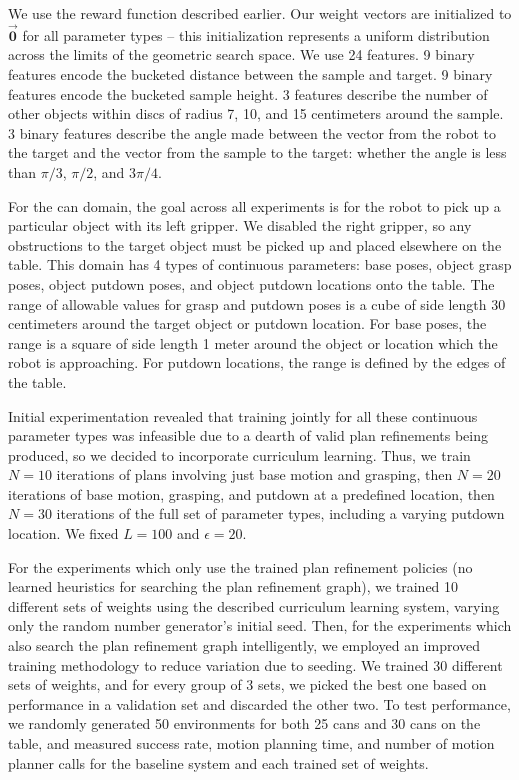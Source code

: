 We use the reward function described earlier. Our weight
vectors are initialized to $\vec{\mathbf{0}}$ for all parameter types -- this
initialization represents a uniform distribution across the limits of the geometric search space.
We use 24 features. 9 binary features encode the bucketed distance between the sample
and target. 9 binary features encode the bucketed sample height. 3 features
describe the number of other objects within discs of radius 7, 10, and 15 centimeters around the
sample. 3 binary features describe the angle made between the vector from the
robot to the target and the vector from the sample to the target: whether the angle is less than
$\pi/3$, $\pi/2$, and $3\pi/4$.

For the can domain, the goal across all experiments is for the robot to pick up a particular object with its
left gripper. We disabled the right gripper, so any obstructions to the target object must be picked up and
placed elsewhere on the table. This domain has 4 types of continuous parameters: base poses, object grasp
poses, object putdown poses, and object putdown locations onto the table. The range of allowable values for
grasp and putdown poses is a cube of side length 30 centimeters around
the target object or putdown location. For base poses, the range is a
square of side length 1 meter around the object or location which the robot is approaching. For putdown locations,
the range is defined by the edges of the table.

Initial experimentation revealed that training jointly for all these continuous
parameter types was infeasible due to a dearth of valid plan refinements being produced, so we decided to
incorporate curriculum learning. Thus, we train $N = 10$ iterations of plans involving just base motion and grasping,
then $N = 20$ iterations of base motion, grasping, and putdown at a predefined location, then $N = 30$ iterations of
the full set of parameter types, including a varying putdown location. We fixed $L = 100$ and $\epsilon = 20$.

For the experiments which only use the trained plan refinement policies (no learned heuristics for searching the plan
refinement graph), we trained 10 different sets of weights using the described curriculum learning system, varying
only the random number generator's initial seed. Then, for the experiments which also search the plan refinement graph
intelligently, we employed an improved training methodology to reduce variation due to seeding. We trained 30 different
sets of weights, and for every group of 3 sets, we picked the best one based on performance in a validation set and discarded
the other two. To test performance, we randomly generated 50 environments for both 25 cans and 30 cans on the table,
and measured success rate, motion planning time, and number of motion planner calls for the baseline system and each
trained set of weights.

